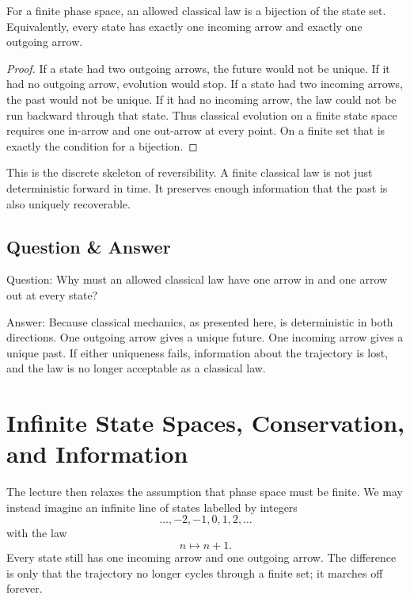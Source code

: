 \begin{proposition}
For a finite phase space, an allowed classical law is a bijection of the state set. Equivalently, every state has exactly one incoming arrow and exactly one outgoing arrow.
\end{proposition}

\begin{proof}
If a state had two outgoing arrows, the future would not be unique. If it had no outgoing arrow, evolution would stop. If a state had two incoming arrows, the past would not be unique. If it had no incoming arrow, the law could not be run backward through that state. Thus classical evolution on a finite state space requires one in-arrow and one out-arrow at every point. On a finite set that is exactly the condition for a bijection.
\end{proof}

\begin{remark}
This is the discrete skeleton of reversibility. A finite classical law is not just deterministic forward in time. It preserves enough information that the past is also uniquely recoverable.
\end{remark}

\subsection{Question \& Answer}

Question: Why must an allowed classical law have one arrow in and one arrow out at every state?

Answer: Because classical mechanics, as presented here, is deterministic in both directions. One outgoing arrow gives a unique future. One incoming arrow gives a unique past. If either uniqueness fails, information about the trajectory is lost, and the law is no longer acceptable as a classical law.

\section{Infinite State Spaces, Conservation, and Information}

The lecture then relaxes the assumption that phase space must be finite. We may instead imagine an infinite line of states labelled by integers
\[
\ldots,-2,-1,0,1,2,\ldots
\]
with the law
\begin{equation}
n \mapsto n+1.
\end{equation}
Every state still has one incoming arrow and one outgoing arrow. The difference is only that the trajectory no longer cycles through a finite set; it marches off forever.

